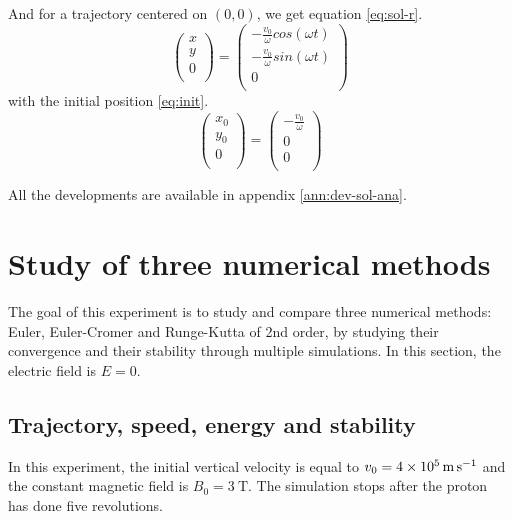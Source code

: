 \documentclass[a4paper,12pt,twoside]{article}
\begin{document}
And for a trajectory centered on $(0,0)$, we get equation \ref{eq:sol-r}.
\begin{equation}
	\begin{pmatrix} x\\ y\\ 0\\ \end{pmatrix} = \begin{pmatrix} -\frac{v_0}{\omega} cos(\omega t)\\ -\frac{v_0}{\omega} sin(\omega t)\\ 0\\ \end{pmatrix}
\label{eq:sol-r}
\end{equation}
with the initial position \ref{eq:init}.
\begin{equation}
	\begin{pmatrix} x_0\\ y_0\\ 0\\ \end{pmatrix} = \begin{pmatrix} -\frac{v_0}{\omega}\\ 0\\ 0\\ \end{pmatrix}
\label{eq:init}
\end{equation}

All the developments are available in appendix \ref{ann:dev-sol-ana}.

\section{Study of three numerical methods}\label{sec:etudes-integrateur}
The goal of this experiment is to study and compare three numerical methods: Euler, Euler-Cromer and Runge-Kutta of 2nd order, by studying their convergence and their stability through multiple simulations.
In this section, the electric field is $E = 0$.
\subsection{Trajectory, speed, energy and stability}
In this experiment, the initial vertical velocity is equal to $v_0 = \SI{4d5}{\meter\per\second}$ and the constant magnetic field is $B_0 = \SI{3}{\tesla}$.
The simulation stops after the proton has done five revolutions.
\end{document}
